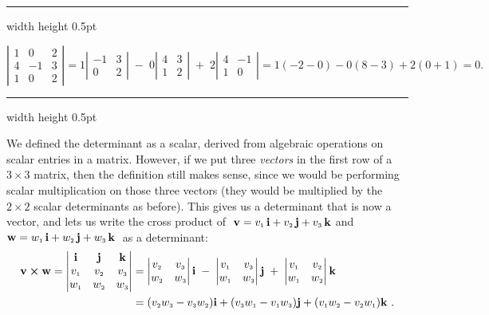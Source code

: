 \medskip
\hrule width \textwidth height 0.5pt
\begin{exmp}
 \begin{displaymath}
  \left|
  \begin{array}{rrr}
   1 & 0 & 2\\
   4 & -1 & 3\\
   1 & 0 & 2
  \end{array}\right|
  = 1 \left|\begin{array}{rr} -1 & 3 \\ 0 & 2 \end{array}\right| \;-\;
  0 \left|\begin{array}{rr} 4 & 3 \\ 1 & 2 \end{array}\right| \;+\;
  2 \left|\begin{array}{rr} 4 & -1 \\ 1 & 0 \end{array}\right|
  = 1(-2 - 0) - 0(8 - 3) + 2(0 + 1) = 0.
 \end{displaymath}
\end{exmp}
\hrule width \textwidth height 0.5pt
\smallskip

We defined the determinant as a scalar, derived from algebraic operations on scalar entries in a matrix. However,
if we put three \emph{vectors} in the first row of a $3 \times 3$ matrix, then the definition still
makes sense, since we would be performing scalar multiplication on those three vectors (they would be multiplied by
the $2 \times 2$ scalar determinants as before). This gives us a determinant that is now a vector, and lets us write the
cross product of $\;\textbf{v} = v_{\scriptscriptstyle 1}\,\textbf{i} + v_{\scriptscriptstyle 2}\,\textbf{j} + v_{\scriptscriptstyle 3}\,\textbf{k}$ and $\textbf{w} = w_{\scriptscriptstyle 1}\,\textbf{i} + w_{\scriptscriptstyle 2}\,\textbf{j} + w_{\scriptscriptstyle 3}\,\textbf{k}\;$ as a determinant:
\begin{align*}
 \textbf{v} \bm{\times} \textbf{w} =
 \begin{vmatrix}
  \textbf{i} & \textbf{j} & \textbf{k} \\ v_{\scriptscriptstyle 1} & v_{\scriptscriptstyle 2} & v_{\scriptscriptstyle 3} \\
  w_{\scriptscriptstyle 1} & w_{\scriptscriptstyle 2} & w_{\scriptscriptstyle 3}
 \end{vmatrix} &= \begin{vmatrix} v_{\scriptscriptstyle 2} & v_{\scriptscriptstyle 3} \\ w_{\scriptscriptstyle 2} & w_{\scriptscriptstyle 3} \end{vmatrix} \textbf{i} \;-\;
 \begin{vmatrix} v_{\scriptscriptstyle 1} & v_{\scriptscriptstyle 3} \\ w_{\scriptscriptstyle 1} & w_{\scriptscriptstyle 3} \end{vmatrix} \textbf{j} \;+\;
 \begin{vmatrix} v_{\scriptscriptstyle 1} & v_{\scriptscriptstyle 2} \\ w_{\scriptscriptstyle 1} & w_{\scriptscriptstyle 2} \end{vmatrix} \textbf{k}\\
 &= (v_{\scriptscriptstyle 2}w_{\scriptscriptstyle 3} -
v_{\scriptscriptstyle 3}w_{\scriptscriptstyle 2})\textbf{i} + (v_{\scriptscriptstyle 3}w_{\scriptscriptstyle 1} - v_{\scriptscriptstyle 1}w_{\scriptscriptstyle 3})\textbf{j} +
(v_{\scriptscriptstyle 1}w_{\scriptscriptstyle 2} - v_{\scriptscriptstyle 2}w_{\scriptscriptstyle 1})\textbf{k} ~.
\end{align*}

